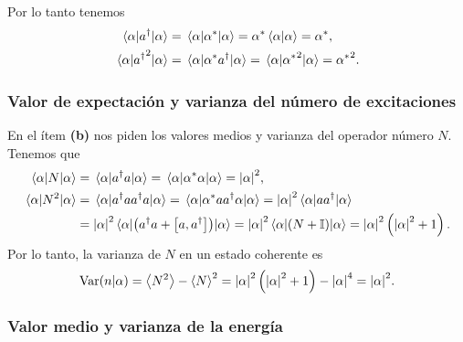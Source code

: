 \documentclass[10pt, a4paper]{article}
\newcommand{\Nexpr}{a^\dagger a}
\newcommand{\N}{N}
\numberwithin{equation}{subsection}
\begin{document}
Por lo tanto tenemos
\begin{align}
  \expval{a^\dagger}{\alpha} &= \expval{{{\alpha}^{*}}}{\alpha} =
    {{\alpha}^{*}}\braket{\alpha}{\alpha} = {{\alpha}^{*}},
    \label{eq:expval_adagger_alpha} \\
  \expval{{a^\dagger}^2}{\alpha} &= \expval{{{\alpha}^{*}}a^\dagger}{\alpha} =
    \expval{{{\alpha}^{*}}^2}{\alpha} = {{\alpha}^{*}}^2.
    \label{eq:expval_adagger2_alpha}
\end{align}

\subsubsection{Valor de expectación y varianza del número de excitaciones}

En el ítem \textbf{(b)} nos piden los valores medios y varianza del operador
número $\N$. Tenemos que
\begin{align}
  \expval{\N}{\alpha} &= \expval{\Nexpr}{\alpha} =
    \expval{\conj{\alpha}\alpha}{\alpha} = \abs{\alpha}^2,
    \label{eq:expval_N_alpha} \\
  \expval{\N^2}{\alpha} &= \expval{\Nexpr\Nexpr}{\alpha} =
    \expval{\conj{\alpha}aa^\dagger\alpha}{\alpha} = 
    \abs{\alpha}^2\expval{aa^\dagger}{\alpha} \nonumber \\
  &= \abs{\alpha}^2\expval{\left(\Nexpr + \comm{a}{a^\dagger}\right)}{\alpha} =
    \abs{\alpha}^2\expval{\left(\N + \Id\right)}{\alpha} = 
    \abs{\alpha}^2\left(\abs{\alpha}^2 + 1\right).
    \label{eq:expval_N2_alpha}
\end{align}
Por lo tanto, la varianza de $\N$ en un estado coherente es
\begin{equation}
  \Var(n|\alpha) = \expval{\N^2} - \expval{\N}^2 =
    \abs{\alpha}^2\left(\abs{\alpha}^2 + 1\right) - \abs{\alpha}^4 = 
    \abs{\alpha}^2.
\end{equation}

\subsubsection{Valor medio y varianza de la energía}
\end{document}
